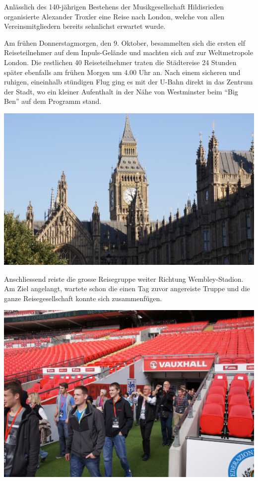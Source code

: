 \begin{history}

    Anlässlich des 140-jährigen Bestehens der Musikgesellschaft Hildisrieden
    organisierte Alexander Troxler eine Reise nach London, welche von allen
    Vereinsmitgliedern bereits sehnlichst erwartet wurde.

    Am frühen Donnerstagmorgen, den 9. Oktober, besammelten sich die ersten elf
    Reiseteilnehmer auf dem Inpuls-Gelände und machten sich auf zur
    Weltmetropole London. Die restlichen 40 Reiseteilnehmer traten die
    Städtereise 24 Stunden später ebenfalls am frühen Morgen um 4.00 Uhr an.
    Nach einem sicheren und ruhigen, eineinhalb stündigen Flug ging es mit der
    U-Bahn direkt in das Zentrum der Stadt, wo ein kleiner Aufenthalt in der
    Nähe von Westminster beim \enquote{Big Ben} auf dem Programm stand.

    \begin{MulticolFigure}
        \centering
        \includegraphics[width=0.93\linewidth]{./chap/2001-2024/2014/Westminster.jpg}
    \end{MulticolFigure}

    Anschliessend reiste die grosse Reisegruppe weiter Richtung Wembley-Stadion.
    Am Ziel angelangt, wartete schon die einen Tag zuvor angereiste Truppe und
    die ganze Reisegesellschaft konnte sich zusammenfügen.


    \begin{MulticolFigure}
        \centering
        \includegraphics[width=0.93\linewidth]{./chap/2001-2024/2014/Einmarsch-Wembley.jpg}
    \end{MulticolFigure}


\end{history}
